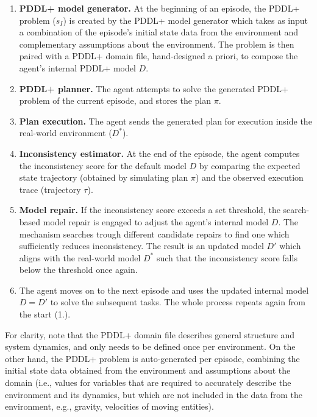 \documentclass[letterpaper]{article} %
\begin{document}
\begin{enumerate}
    \item \textbf{PDDL+ model generator.} At the beginning of an episode, the PDDL+ problem ($s_I$) is created by the PDDL+ model generator which takes as input a combination of the episode's initial state data from the environment and complementary assumptions about the environment. The problem is then paired with a PDDL+ domain file, hand-designed a priori, to compose the agent's internal PDDL+ model $D$. 
    \item \textbf{PDDL+ planner.} The agent attempts to solve the generated PDDL+ problem of the current episode, and stores the plan $\pi$.
    \item \textbf{Plan execution.} The agent sends the generated plan for execution inside the real-world environment ($D^*$).
    \item \textbf{Inconsistency estimator.} At the end of the episode, the agent computes the inconsistency score for the default model $D$ by comparing the expected state trajectory (obtained by simulating plan $\pi$) and the observed execution trace (trajectory $\tau$). 
    \item \textbf{Model repair.} If the inconsistency score exceeds a set threshold, the search-based model repair is engaged to adjust the agent's internal model $D$. The mechanism searches trough different candidate repairs to find one which sufficiently reduces inconsistency. The result is an updated model $D'$ which aligns with the real-world model $D^*$ such that the inconsistency score falls below the threshold once again.
    \item The agent moves on to the next episode and uses the updated internal model $D=D'$ to solve the subsequent tasks. The whole process repeats again from the start (1.).
\end{enumerate}

For clarity, note that the PDDL+ domain file describes general structure and system dynamics, and only needs to be defined once per environment. On the other hand, the PDDL+ problem is auto-generated per episode, combining the initial state data obtained from the environment and assumptions about the domain (i.e., values for variables that are required to accurately describe the environment and its dynamics, but which are not included in the data from the environment, e.g., gravity, velocities of moving entities).
\end{document}
